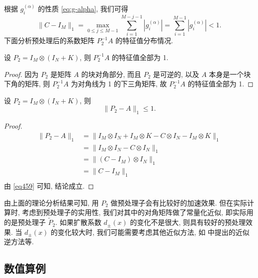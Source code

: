 \documentclass{ecnumaster}
\begin{document}
根据 $g_i^{(\alpha)}$ 的性质 \eqref{eq:g-alpha}, 我们可得
\begin{equation}\label{eq459}
  \| C - I_M \|_{1} = \max _{0 \leq j \leq M-1} \sum _{i = 1}^{M-j-1} |g_{i}^{(\alpha)}|
  = \sum _{i = 1}^{M-1} |g_{i}^{(\alpha)}|
  < 1.
\end{equation}
%
下面分析预处理后的系数矩阵 $P_2^{-1}A$ 的特征值分布情况. %
\begin{theorem}
  设 $P_2 = I_M \otimes (I_N + K)$, 则 $P_2^{-1}A$ 的特征值全部为 1.
\end{theorem}
\begin{proof}
  因为 $P_2$ 是矩阵 $A$ 的块对角部分,
  而且 $P_2$ 是可逆的,
  以及 $A$ 本身是一个块下角的矩阵,
  则 $P_2^{-1}A$ 为对角线为 1 的下三角矩阵,
  故 $P_2^{-1}A$ 的特征值全部为 1.
\end{proof}

\begin{theorem}
  设 $P_2 = I_M \otimes (I_N + K)$, 则
  \begin{equation}
    \| P_2 - A \| _1 \leq 1.
  \end{equation}
\end{theorem}
\begin{proof}
  \begin{equation}
    \begin{split}
      \| P_2 - A \| _1 &= \| I_M \otimes I_N + I_M \otimes K - C \otimes I_N - I_M \otimes K\| _1\\
                     &= \| I_M \otimes I_N - C \otimes I_N \| _1 \\
                     &= \| (C - I_M) \otimes I_N \| _1 \\
                     &= \| C - I_M \| _1\\
    \end{split}
  \end{equation}
  由 \eqref{eq459} 可知, 结论成立.
\end{proof}

由上面的理论分析结果可知, 用 $P_2$ 做预处理子会有比较好的加速效果.
但在实际计算时, 考虑到预处理子的实用性, 我们对其中的对角矩阵做了常量化近似,
即实际用的是预处理子 $\tilde{P}_2$.
如果扩散系数 $d_\pm(x)$ 的变化不是很大, 则具有较好的预处理效果.
当 $d_\pm(x)$ 的变化较大时, 我们可能需要考虑其他近似方法,
如 \cite{PKNS14} 中提出的近似逆方法等.

\subsection{数值算例}
\end{document}
